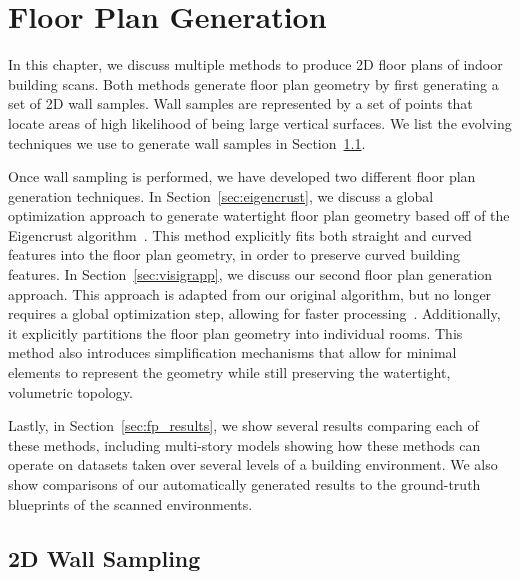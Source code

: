 \documentclass[12pt,onecolumn,oneside]{book}
\begin{document}

\chapter{Floor Plan Generation}
\label{ch:floorplan}

In this chapter, we discuss multiple methods to produce 2D floor plans of indoor building scans.  Both methods generate floor plan geometry by first generating a set of 2D wall samples.  Wall samples are represented by a set of points that locate areas of high likelihood of being large vertical surfaces.  We list the evolving techniques we use to generate wall samples in Section~\ref{sec:wall_sampling}.

Once wall sampling is performed, we have developed two different floor plan generation techniques.  In Section~\ref{sec:eigencrust}, we discuss a global optimization approach to generate watertight floor plan geometry based off of the Eigencrust algorithm~\cite{EigencrustShewchuk,Turner12}.  This method explicitly fits both straight and curved features into the floor plan geometry, in order to preserve curved building features.  In Section~\ref{sec:visigrapp}, we discuss our second floor plan generation approach.  This approach is adapted from our original algorithm, but no longer requires a global optimization step, allowing for faster processing~\cite{Turner14}.  Additionally, it explicitly partitions the floor plan geometry into individual rooms.  This method also introduces simplification mechanisms that allow for minimal elements to represent the geometry while still preserving the watertight, volumetric topology.

Lastly, in Section~\ref{sec:fp_results}, we show several results comparing each of these methods, including multi-story models showing how these methods can operate on datasets taken over several levels of a building environment.  We also show comparisons of our automatically generated results to the ground-truth blueprints of the scanned environments.

\section{2D Wall Sampling}
\label{sec:wall_sampling}
\end{document}
